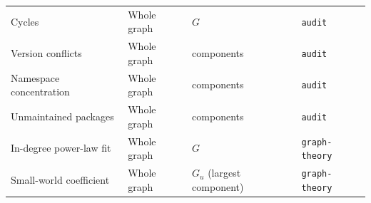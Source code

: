 \begin{table}[!htpb]
\begin{tabular}{lllp{3.2cm}}
        Cycles & Whole graph & \(G\) & \texttt{audit} \\
        Version conflicts & Whole graph & components & \texttt{audit} \\
        Namespace concentration & Whole graph & components & \texttt{audit} \\
        Unmaintained packages & Whole graph & components & \texttt{audit} \\
        In-degree power-law fit & Whole graph & \(G\) & \texttt{graph-theory} \\
        Small-world coefficient & Whole graph & \(G_u\) (largest component) & \texttt{graph-theory} \\
        \bottomrule
    \end{tabular}
\end{table}
